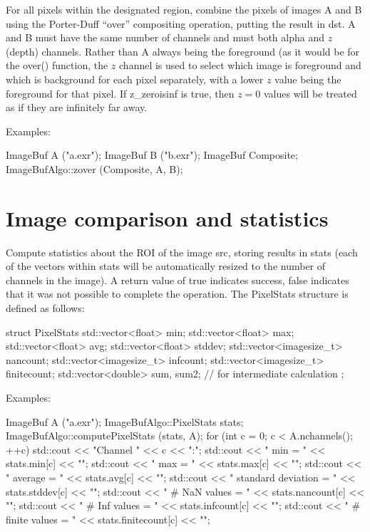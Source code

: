 For all pixels within the designated region, combine the pixels of
images {\cf A} and {\cf B} using the Porter-Duff ``over'' compositing
operation, putting the result in {\cf dst}.  {\cf A} and {\cf B} must
have the same number of channels and must both alpha and $z$ (depth)
channels. Rather than {\cf A} always being the foreground (as it would
be for the {\cf over()} function, the $z$ channel is used to select
which image is foreground and which is background for each pixel
separately, with a lower $z$ value being the foreground for that pixel.
If {\cf z_zeroisinf} is {\cf true}, then $z=0$ values will be treated
as if they are infinitely far away.

\smallskip
\noindent Examples:
\begin{code}
    ImageBuf A ("a.exr");
    ImageBuf B ("b.exr");
    ImageBuf Composite;
    ImageBufAlgo::zover (Composite, A, B);
\end{code}
\apiend


\section{Image comparison and statistics}
\label{sec:iba:stats}

 

Compute statistics about the ROI of the image {\cf src}, storing results
in {\cf stats} (each of the vectors within {\cf stats} will be
automatically resized to the number of channels in the image).  A return
value of {\cf true} indicates success, {\cf false} indicates that it was
not possible to complete the operation.
 The {\cf PixelStats} structure is defined as follows:
\begin{code}
struct PixelStats {
    std::vector<float> min;
    std::vector<float> max;
    std::vector<float> avg;
    std::vector<float> stddev;
    std::vector<imagesize_t> nancount;
    std::vector<imagesize_t> infcount;
    std::vector<imagesize_t> finitecount;
    std::vector<double> sum, sum2;  // for intermediate calculation
};
\end{code}

\smallskip
\noindent Examples:
\begin{code}
    ImageBuf A ("a.exr");
    ImageBufAlgo::PixelStats stats;
    ImageBufAlgo::computePixelStats (stats, A);
    for (int c = 0;  c < A.nchannels();  ++c) {
        std::cout << "Channel " << c << ":\n";
        std::cout << "   min = " << stats.min[c] << "\n";
        std::cout << "   max = " << stats.max[c] << "\n";
        std::cout << "   average = " << stats.avg[c] << "\n";
        std::cout << "   standard deviation  = " << stats.stddev[c] << "\n";
        std::cout << "   # NaN values    = " << stats.nancount[c] << "\n";
        std::cout << "   # Inf values    = " << stats.infcount[c] << "\n";
        std::cout << "   # finite values = " << stats.finitecount[c] << "\n";
    }
\end{code}
\apiend

